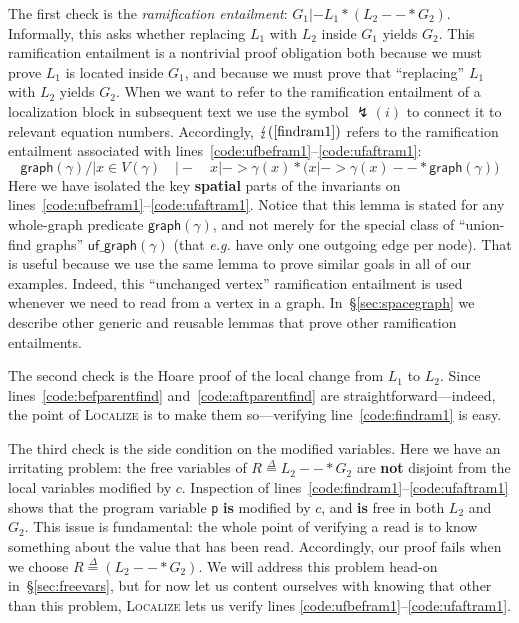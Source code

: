 \documentclass[acmsmall,review,anonymous]{acmart}\settopmatter{printfolios=true,printccs=false,printacmref=false}
\newcommand{\defeq}{\mathbin{\stackrel{\Delta}{=}}}
\newcommand{\p}[1]{\ensuremath{\mathsf{#1}}} \newcommand{\m}[1]{\ensuremath{\mathit{#1}}} \newcommand{\ma}[1]{\ensuremath{\mathcal{#1}}} \let\ramify\lightning
\begin{document}
The first check is the \emph{ramification entailment}: $G_1 |- L_1 * (L_2 --* G_2)$.
Informally, this asks whether replacing $L_1$ with $L_2$ inside $G_1$ yields $G_2$.
This ramification entailment is a nontrivial proof obligation both because
we must prove $L_1$ is located inside $G_1$, and because we must prove that
``replacing'' $L_1$ with $L_2$ yields $G_2$.
When we want to refer to the ramification entailment of a localization block in
subsequent text we use the symbol $\ramify(i)$ to connect it to relevant equation
numbers.  Accordingly, $\ramify(\ref{findram1})$ refers to the ramification entailment
associated with lines~\ref{code:ufbefram1}--\ref{code:ufaftram1}:
\begin{equation}
\label{findram1}
\p{graph}(\gamma) /| x \in V(\gamma) \quad |- \quad x |-> \gamma(x) * \big(x |-> \gamma(x) --* \p{graph}(\gamma)\big)
\end{equation}
Here we have isolated the key \textbf{spatial} parts of the invariants on lines~\ref{code:ufbefram1}--\ref{code:ufaftram1}.  Notice that this lemma is stated for any whole-graph predicate $\p{graph}(\gamma)$, and not merely for the special class of ``union-find graphs'' $\p{uf\_graph}(\gamma)$ (that \emph{e.g.} have only one outgoing edge per node).  That is useful because we use the same lemma to prove similar goals in all of our examples.
Indeed, this ``unchanged vertex'' ramification entailment is used whenever we need to read from a vertex in a graph.  In~\S\ref{sec:spacegraph} we describe other generic and reusable lemmas that prove other ramification entailments.

The second check is the Hoare proof of the local
change from $L_1$ to $L_2$.  Since lines~\ref{code:befparentfind} and~\ref{code:aftparentfind}
are straightforward---indeed, the point of \textsc{Localize} is to make them
so---verifying line~\ref{code:findram1} is easy.

The third check is the side condition on the modified variables.  Here we have an irritating
problem: the free variables of $R \defeq L_2 --* G_2$ are \textbf{not} disjoint from
the local variables modified by $c$.  Inspection of lines~\ref{code:findram1}--\ref{code:ufaftram1} shows that the program variable \texttt{p} \textbf{is} modified by $c$,
and \textbf{is} free in both $L_2$ and $G_2$.
This issue is fundamental: the whole point of verifying
a read is to know something about the value that has been read.
Accordingly, our proof fails when we choose $R \defeq (L_2 --* G_2)$.
We will address this problem
head-on in~\S\ref{sec:freevars}, but for now let us content ourselves with knowing
that other than this problem, \textsc{Localize} lets us verify
lines \ref{code:ufbefram1}--\ref{code:ufaftram1}.
\end{document}
